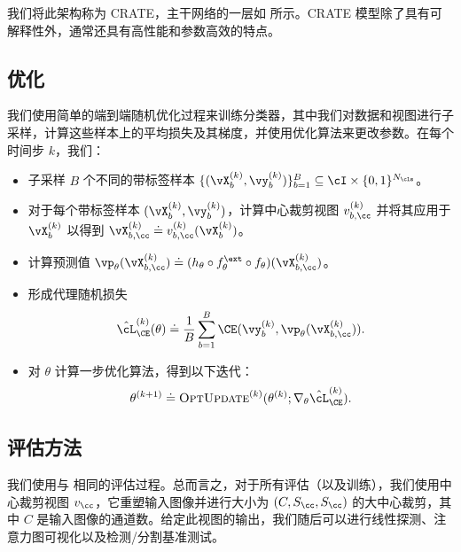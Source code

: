 \documentclass[../../book-main_zh.tex]{subfiles}
\begin{document}
我们将此架构称为 CRATE，主干网络的一层如  所示。CRATE 模型除了具有可解释性外，通常还具有高性能和参数高效的特点。

\subsection{优化} \label{sub:image_classification_optimization}

我们使用简单的端到端随机优化过程来训练分类器，其中我们对数据和视图进行子采样，计算这些样本上的平均损失及其梯度，并使用优化算法来更改参数。在每个时间步 \(k\)，我们：
\begin{itemize}
\item 子采样 \(B\) 个不同的带标签样本 \(\{(\vX_{b}^{(k)},
    \vy_{b}^{(k)})\}_{b = 1}^{B} \subseteq \cI \times \{0, 1\}^{N_{\cls}}\)。
\item 对于每个带标签样本 \((\vX_{b}^{(k)}, \vy_{b}^{(k)})\)，计算中心裁剪视图 \(v_{b, \cc}^{(k)}\) 并将其应用于 \(\vX_{b}^{(k)}\) 以得到 \(\vX_{b, \cc}^{(k)} \doteq v_{b,
    \cc}^{(k)}(\vX_{b}^{(k)})\)。
\item 计算预测值 \(\vp_{\theta}(\vX_{b, \cc}^{(k)})
        \doteq (h_{\theta} \circ f_{\theta}^{\ext} \circ
    f_{\theta})(\vX_{b, \cc}^{(k)})\)。
\item 形成代理随机损失
    \begin{equation}
        \hat{\cL}_{\CE}^{(k)}(\theta) \doteq \frac{1}{B}\sum_{b =
        1}^{B}\CE(\vy_{b}^{(k)}, \vp_{\theta}(\vX_{b, \cc}^{(k)})).
    \end{equation}
\item 对 \(\theta\) 计算一步优化算法，得到以下迭代：
    \begin{equation}
        \theta^{(k + 1)} \doteq
        \textsc{OptUpdate}^{(k)}(\theta^{(k)};
        \nabla_{\theta}\hat{\cL}_{\CE}^{(k)}).
    \end{equation}
\end{itemize}

\subsection{评估方法} \label{sub:image_classification_evals}

我们使用与  相同的评估过程。总而言之，对于所有评估（以及训练），我们使用中心裁剪视图 \(v_{\cc}\)，它重塑输入图像并进行大小为 \((C, S_{\cc}, S_{\cc})\) 的大中心裁剪，其中 \(C\) 是输入图像的通道数。给定此视图的输出，我们随后可以进行线性探测、注意力图可视化以及检测/分割基准测试。
\end{document}
